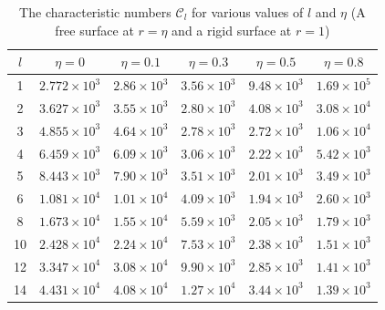 \begin{table}[ht]
\centering
\caption{The characteristic numbers $\mathcal{C}_l$ for various values of $l$ and $\eta$\newline
(A free surface at $r = \eta$ and a rigid surface at $r = 1$)}
\label{tab:XXIV}
\begin{tabular}{c c c c c c}
\hline
$l$ & $\eta = 0$ & $\eta = 0.1$ & $\eta = 0.3$ & $\eta = 0.5$ & $\eta = 0.8$ \\
\hline
1 & $2.772\times 10^3$ & $2.86\times 10^3$ & $3.56\times 10^3$ & $9.48\times 10^3$ & $1.69\times 10^5$ \\
2 & $3.627\times 10^3$ & $3.55\times 10^3$ & $2.80\times 10^3$ & $4.08\times 10^3$ & $3.08\times 10^4$ \\
3 & $4.855\times 10^3$ & $4.64\times 10^3$ & $2.78\times 10^3$ & $2.72\times 10^3$ & $1.06\times 10^4$ \\
4 & $6.459\times 10^3$ & $6.09\times 10^3$ & $3.06\times 10^3$ & $2.22\times 10^3$ & $5.42\times 10^3$ \\
5 & $8.443\times 10^3$ & $7.90\times 10^3$ & $3.51\times 10^3$ & $2.01\times 10^3$ & $3.49\times 10^3$ \\
6 & $1.081\times 10^4$ & $1.01\times 10^4$ & $4.09\times 10^3$ & $1.94\times 10^3$ & $2.60\times 10^3$ \\
8 & $1.673\times 10^4$ & $1.55\times 10^4$ & $5.59\times 10^3$ & $2.05\times 10^3$ & $1.79\times 10^3$ \\
10 & $2.428\times 10^4$ & $2.24\times 10^4$ & $7.53\times 10^3$ & $2.38\times 10^3$ & $1.51\times 10^3$ \\
12 & $3.347\times 10^4$ & $3.08\times 10^4$ & $9.90\times 10^3$ & $2.85\times 10^3$ & $1.41\times 10^3$ \\
14 & $4.431\times 10^4$ & $4.08\times 10^4$ & $1.27\times 10^4$ & $3.44\times 10^3$ & $1.39\times 10^3$ \\
\hline
\end{tabular}
\end{table}

